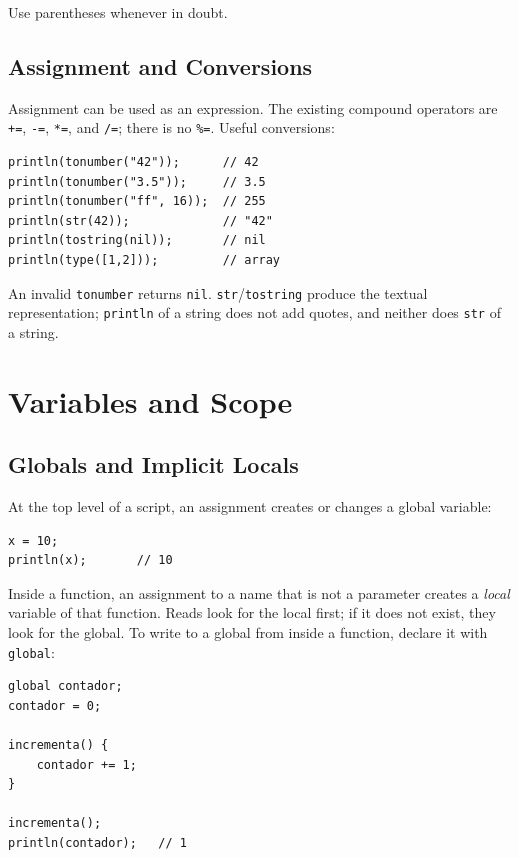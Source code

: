 \documentclass[11pt,a4paper,oneside]{report}
\newcommand{\code}[1]{\texttt{#1}}
\begin{document}
Use parentheses whenever in doubt.

\section{Assignment and Conversions}
Assignment can be used as an expression. The existing compound operators
are \code{+=}, \code{-=}, \code{*=}, and \code{/=}; there is no
\code{\%=}. Useful conversions:

\begin{lstlisting}
println(tonumber("42"));      // 42
println(tonumber("3.5"));     // 3.5
println(tonumber("ff", 16));  // 255
println(str(42));             // "42"
println(tostring(nil));       // nil
println(type([1,2]));         // array
\end{lstlisting}

An invalid \code{tonumber} returns \code{nil}. \code{str}/\code{tostring}
produce the textual representation; \code{println} of a string does not
add quotes, and neither does \code{str} of a string.

\chapter{Variables and Scope}
\label{cap:variaveis}

\section{Globals and Implicit Locals}
At the top level of a script, an assignment creates or changes a global
variable:

\begin{lstlisting}
x = 10;
println(x);       // 10
\end{lstlisting}

Inside a function, an assignment to a name that is not a parameter
creates a \emph{local} variable of that function. Reads look for the
local first; if it does not exist, they look for the global. To write to a
global from inside a function, declare it with \code{global}:

\begin{lstlisting}
global contador;
contador = 0;

incrementa() {
    contador += 1;
}

incrementa();
println(contador);   // 1
\end{lstlisting}
\end{document}
